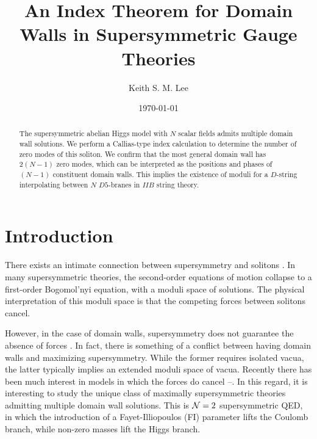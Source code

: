 \documentclass[a4paper,preprint,preprintnumbers,amsmath,amssymb]{revtex4}
\begin{document}

\title{An Index Theorem for Domain Walls in Supersymmetric Gauge Theories}

\author{Keith S. M. Lee}
%

\date{\today}

\begin{abstract}
The supersymmetric abelian Higgs model with $N$ scalar fields admits 
multiple domain wall solutions. We perform a Callias-type index 
calculation to determine the number of zero modes of this 
soliton. We confirm that the most general domain wall has 
$2(N-1)$ zero modes, which can be interpreted as the 
positions and phases of $(N-1)$ constituent domain walls. This 
implies the existence of moduli for a $D$-string interpolating 
between $N$ $D5$-branes in $IIB$ string theory.
\end{abstract}

\maketitle

\section{\label{sec:intro} Introduction}

There exists an intimate connection between supersymmetry and solitons
\cite{WO78}. 
In many supersymmetric theories, the second-order equations of motion collapse 
to a first-order Bogomol'nyi equation, with a moduli space of solutions. 
The physical interpretation of this moduli space is that the competing 
forces between solitons cancel.

However, in the case of domain walls, supersymmetry does not 
guarantee the absence of forces \cite{PT02}.
In fact, there is something of a conflict between having domain walls and 
maximizing supersymmetry. While the former requires isolated vacua, 
the latter typically implies an extended moduli space of vacua. 
Recently there has been much interest in models in which the forces do
cancel \cite{ms98}--\cite{PV01}. 
In this regard, it is interesting to study the unique class of maximally
supersymmetric theories admitting multiple domain wall solutions.
This is ${\cal N}=2$ supersymmetric QED, in which the introduction of a 
Fayet-Illiopoulos (FI) parameter lifts the Coulomb branch, while 
non-zero masses lift the Higgs branch. 
\end{document}
